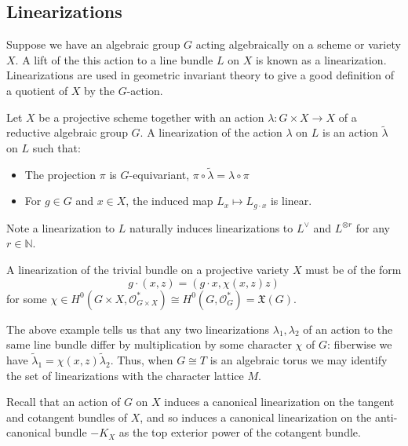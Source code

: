 \subsection{Linearizations} \label{basics:linearizations}
Suppose we have an algebraic group \(G\) acting algebraically on a scheme or variety \(X\). A lift of the this action to a line bundle \(L\) on \(X\) is known as a linearization. Linearizations are used in geometric invariant theory to give a good definition of a quotient of \(X\) by the \(G\)-action.
\begin{definition}
Let \(X\) be a projective scheme together with an action \( \lambda : G \times X \to X\) of a reductive algebraic group \(G\). A linearization of the action \(\lambda\) on \(L\) is an action \(\tilde{\lambda}\) on \(L\) such that:
\begin{itemize}
\item The projection \(\pi\) is \(G\)-equivariant, \(\pi \circ \tilde{\lambda} = \lambda \circ \pi \)
\item For \(g \in G\) and \(x \in X\), the induced map \(L_x \mapsto L_{g \cdot x}\) is linear.
\end{itemize}
\end{definition}
%
%
%
Note a linearization to \(L\) naturally induces linearizations to \(L^\vee\) and \(L^{\otimes r}\) for any \(r \in \mathbb{N}\).
%
%
%
\begin{example}
A linearization of the trivial bundle on a projective variety \(X\) must be of the form
\[
g \cdot (x,z) = (g \cdot x, \chi(x,z)z)
\]
for some \(\chi \in H^0(G \times X, \mathcal{O}_{G \times X}^*) \cong H^0(G, \mathcal{O}_G^*) = \mathfrak{X}(G).\)
\end{example}
The above example tells us that any two linearizations \(\lambda_1,\lambda_2\) of an action to the same line bundle differ by multiplication by some character \(\chi\) of \(G\): fiberwise we have \(\tilde{\lambda}_1 = \chi(x,z) \tilde{\lambda}_2\). Thus, when \(G \cong T\) is an algebraic torus we may identify the set of linearizations with the character lattice \(M\).
\begin{example}
Recall that an action of \(G\) on \(X\) induces a canonical linearization on the tangent and cotangent bundles of \(X\), and so induces a canonical linearization on the anti-canonical bundle \(-K_X\) as the top exterior power of the cotangent bundle.
\end{example}
